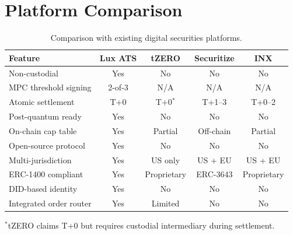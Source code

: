\section{Platform Comparison}
\label{sec:comparison}

\begin{table}[H]
\centering
\caption{Comparison with existing digital securities platforms.}
\label{tab:comparison}
\begin{tabular}{lcccc}
\toprule
\textbf{Feature} & \textbf{Lux ATS} & \textbf{tZERO} & \textbf{Securitize} & \textbf{INX} \\
\midrule
Non-custodial & Yes & No & No & No \\
MPC threshold signing & 2-of-3 & N/A & N/A & N/A \\
Atomic settlement & T+0 & T+0$^*$ & T+1--3 & T+0--2 \\
Post-quantum ready & Yes & No & No & No \\
On-chain cap table & Yes & Partial & Off-chain & Partial \\
Open-source protocol & Yes & No & No & No \\
Multi-jurisdiction & Yes & US only & US + EU & US + EU \\
ERC-1400 compliant & Yes & Proprietary & ERC-3643 & Proprietary \\
DID-based identity & Yes & No & No & No \\
Integrated order router & Yes & Limited & No & No \\
\bottomrule
\end{tabular}
\end{table}

{\footnotesize $^*$tZERO claims T+0 but requires custodial intermediary during settlement.}

